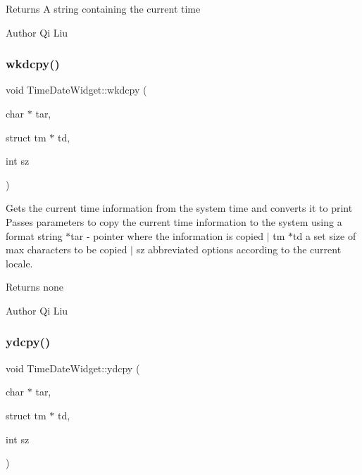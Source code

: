 \begin{DoxyReturn}{Returns}
A string containing the current time 
\end{DoxyReturn}
\begin{DoxyAuthor}{Author}
Qi Liu 
\end{DoxyAuthor}
\mbox{\label{class_time_date_widget_a246faf35eac50b09e6abcce4e7be05bb}} 
\subsubsection{\texorpdfstring{wkdcpy()}{wkdcpy()}}
{\footnotesize\ttfamily void Time\+Date\+Widget\+::wkdcpy (\begin{DoxyParamCaption}\item[{char $\ast$}]{tar,  }\item[{struct tm $\ast$}]{td,  }\item[{int}]{sz }\end{DoxyParamCaption})}



Gets the current time information from the system time and converts it to print  Passes parameters to copy the current time information to the system using a format string  $\ast$tar -\/ pointer where the information is copied $\vert$ tm $\ast$td a set size of max characters to be copied $\vert$ sz abbreviated options according to the current locale. 

\begin{DoxyReturn}{Returns}
none 
\end{DoxyReturn}
\begin{DoxyAuthor}{Author}
Qi Liu 
\end{DoxyAuthor}
\mbox{\label{class_time_date_widget_afce189c830553f6da526d5090849c6f4}} 
\subsubsection{\texorpdfstring{ydcpy()}{ydcpy()}}
{\footnotesize\ttfamily void Time\+Date\+Widget\+::ydcpy (\begin{DoxyParamCaption}\item[{char $\ast$}]{tar,  }\item[{struct tm $\ast$}]{td,  }\item[{int}]{sz }\end{DoxyParamCaption})}



